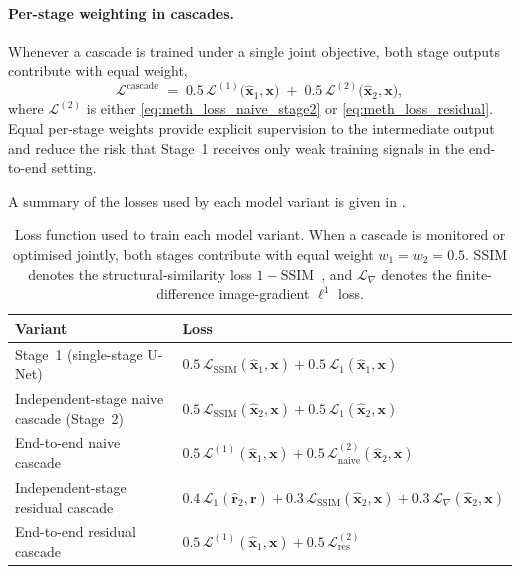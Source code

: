 \paragraph{Per-stage weighting in cascades.}
Whenever a cascade is trained under a single joint objective, both stage outputs contribute with equal weight,
\begin{equation}
    \mathcal{L}^{\mathrm{cascade}}
    \;=\; 0.5\,\mathcal{L}^{(1)}\!\bigl(\hat{\mathbf{x}}_{1}, \mathbf{x}\bigr)
    \;+\; 0.5\,\mathcal{L}^{(2)}\!\bigl(\hat{\mathbf{x}}_{2}, \mathbf{x}\bigr),
    \label{eq:meth_loss_cascade_weighted}
\end{equation}
where \(\mathcal{L}^{(2)}\) is either \eqref{eq:meth_loss_naive_stage2} or \eqref{eq:meth_loss_residual}. Equal per-stage weights provide explicit supervision to the intermediate output and reduce the risk that Stage~1 receives only weak training signals in the end-to-end setting.

A summary of the losses used by each model variant is given in .

\begin{table}[!htb]
    \centering
    \caption[Loss function per cascade variant.]{%
        Loss function used to train each model variant. When a cascade is monitored or optimised jointly, both stages contribute with equal weight \(w_{1}=w_{2}=0.5\). SSIM denotes the structural-similarity loss \(1-\mathrm{SSIM}\)~\cite{Wang2004}, and $\mathcal{L}_{\nabla}$ denotes the finite-difference image-gradient $\ell^{1}$ loss.}
    \label{tab:meth_losses}
    \setlength{\tabcolsep}{4pt}
    \small
    \begin{tabular}{@{}l l@{}}
        \toprule
        Variant & Loss \\
        \midrule
        Stage~1 (single-stage U-Net) &
        $0.5\,\mathcal{L}_{\mathrm{SSIM}}(\hat{\mathbf{x}}_{1},\mathbf{x}) + 0.5\,\mathcal{L}_{1}(\hat{\mathbf{x}}_{1},\mathbf{x})$ \\
        Independent-stage naive cascade (Stage~2) &
        $0.5\,\mathcal{L}_{\mathrm{SSIM}}(\hat{\mathbf{x}}_{2},\mathbf{x}) + 0.5\,\mathcal{L}_{1}(\hat{\mathbf{x}}_{2},\mathbf{x})$ \\
        End-to-end naive cascade &
        $0.5\,\mathcal{L}^{(1)}(\hat{\mathbf{x}}_{1},\mathbf{x}) + 0.5\,\mathcal{L}^{(2)}_{\mathrm{naive}}(\hat{\mathbf{x}}_{2},\mathbf{x})$ \\
        Independent-stage residual cascade &
        $0.4\,\mathcal{L}_{1}(\hat{\mathbf{r}}_{2},\mathbf{r}) + 0.3\,\mathcal{L}_{\mathrm{SSIM}}(\hat{\mathbf{x}}_{2},\mathbf{x}) + 0.3\,\mathcal{L}_{\nabla}(\hat{\mathbf{x}}_{2},\mathbf{x})$ \\
        End-to-end residual cascade &
        $0.5\,\mathcal{L}^{(1)}(\hat{\mathbf{x}}_{1},\mathbf{x}) + 0.5\,\mathcal{L}^{(2)}_{\mathrm{res}}$ \\
        \bottomrule
    \end{tabular}
\end{table}
